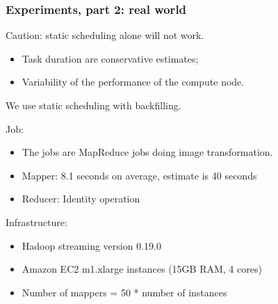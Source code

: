 \documentclass{beamer}
\begin{document}
\begin{frame}
  \frametitle{ Experiments, part 2: real world }

  Caution: static scheduling alone will not work.
  \begin{itemize}
  \item Task duration are conservative estimates;
  \item Variability of the performance of the compute node.
  \end{itemize}
  We use static scheduling with backfilling.

  \hfill

  Job:
  \begin{itemize}
  \item The jobs are MapReduce jobs doing image transformation.
  \item Mapper: 8.1 seconds on average, estimate is 40 seconds
  \item Reducer: Identity operation
  \end{itemize}

  \hfill

  Infrastructure:
  \begin{itemize}
  \item Hadoop streaming version 0.19.0
  \item Amazon EC2 m1.xlarge instances (15GB RAM, 4 cores)
  \item Number of mappers = 50 * number of instances
  \end{itemize}

\end{frame}
\end{document}
